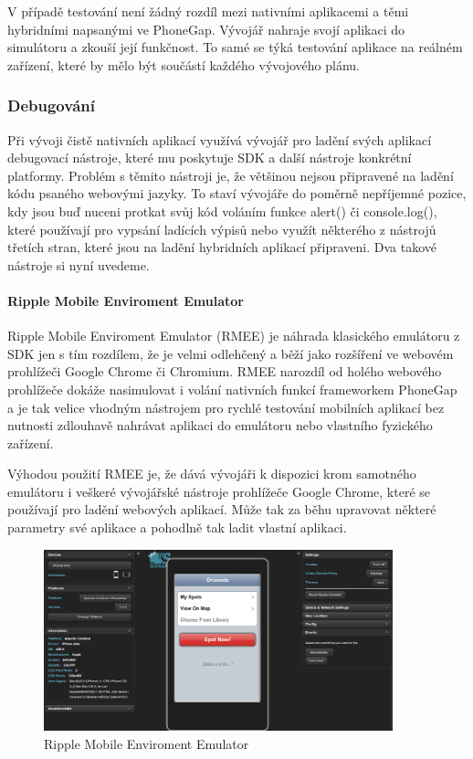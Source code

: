 V případě testování není žádný rozdíl mezi nativními aplikacemi a těmi hybridními napsanými ve PhoneGap. Vývojář nahraje svojí aplikaci do simulátoru a zkouší její funkčnost. To samé se týká testování aplikace na reálném zařízení, které by mělo být součástí každého vývojového plánu.

\subsubsection{Debugování}
Při vývoji čistě nativních aplikací využívá vývojář pro ladění svých aplikací debugovací nástroje, které mu poskytuje SDK a další nástroje konkrétní platformy. Problém s těmito nástroji je, že většinou nejsou připravené na ladění kódu psaného webovými jazyky. To staví vývojáře do poměrně nepříjemné pozice, kdy jsou buď nuceni protkat svůj kód voláním funkce alert() či console.log(), které používají pro vypsání ladících výpisů nebo využít některého z nástrojů třetích stran, které jsou na ladění hybridních aplikací připraveni. Dva takové nástroje si nyní uvedeme.

\paragraph{Ripple Mobile Enviroment Emulator}
Ripple Mobile Enviroment Emulator (RMEE) je náhrada klasického emulátoru z SDK jen s tím rozdílem, že je velmi odlehčený a běží jako rozšíření ve webovém prohlížeči Google Chrome či Chromium. RMEE narozdíl od holého webového prohlížeče dokáže nasimulovat i volání nativních funkcí frameworkem PhoneGap a je tak velice vhodným nástrojem pro rychlé testování mobilních aplikací bez nutnosti zdlouhavě nahrávat aplikaci do emulátoru nebo vlastního fyzického zařízení.

Výhodou použití RMEE je, že dává vývojáři k dispozici krom samotného emulátoru i veškeré vývojářské nástroje prohlížeče Google Chrome, které se používají pro ladění webových aplikací. Může tak za běhu upravovat některé parametry své aplikace a pohodlně tak ladit vlastní aplikaci.

\begin{figure}\centering
\includegraphics[width=0.9\textwidth]{RMEE.png}
\caption{Ripple Mobile Enviroment Emulator}
\label{fig:RMEE}
\end{figure} 


